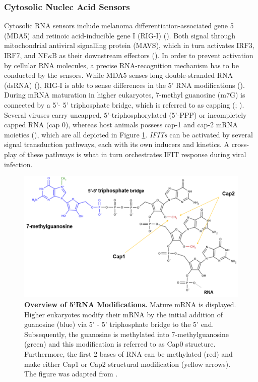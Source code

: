 \subsubsection{Cytosolic Nuclec Acid Sensors} \label{Cytosolic Nuclec Acid Sensors}
Cytosolic RNA sensors include melanoma differentiation-associated gene 5 (MDA5) and retinoic acid-inducible gene I (RIG-I) (\cite{Vladimer2014IFITs:Proteins}). Both signal through mitochondrial antiviral signalling protein (MAVS), which in turn activates IRF3, IRF7, and NF\(\kappa\)B as their downstream effectors (\cite{Ashley2019Interferon-IndependentCytomegalovirus}). In order to prevent activation by cellular RNA molecules, a precise RNA-recognition mechanism has to be conducted by the sensors. While MDA5 senses long double-stranded RNA (dsRNA) (\cite{Brisse2019ComparativeMDA5.}), RIG-I is able to sense differences in the 5’ RNA modifications (\cite{Schlee2016DiscriminatingSensing}). During mRNA maturation in higher eukaryotes, 7-methyl guanosine (m7G) is connected by a 5'- 5' triphosphate bridge, which is referred to as capping (\cite{Devarkar2016StructuralRIG-I}; \cite{Ramanathan2016MRNAApplications}). Several viruses carry uncapped, 5'-triphosphorylated (5'-PPP) or incompletely capped RNA (cap 0), whereas host animals possess cap-1 and cap-2 mRNA moieties (\cite{Choi2018ACaps}), which are all depicted in Figure \ref{fig:Overview of 5'RNA Modifications.}. \textit{IFITs} can be activated by several signal transduction pathways, each with its own inducers and kinetics. A cross-play of these pathways is what in turn orchestrates IFIT response during viral infection.

\begin{figure}
    \centering
    \includegraphics[width=0.75\linewidth]{04. Introduction//Figs/02. 5-RNA Modifications.png}
    \caption[Overview of 5'RNA Modifications.]{\textbf{Overview of 5'RNA Modifications.} Mature mRNA is displayed. Higher eukaryotes modify their mRNA by the initial addition of guanosine (blue) via 5’ - 5’ triphosphate bridge to the 5’ end. Subsequently, the guanosine is methylated into 7-methylguanosine (green) and this modification is referred to as Cap0 structure. Furthermore, the first 2 bases of RNA can be methylated (red) and make either Cap1 or Cap2 structural modification (yellow arrows). The figure was adapted from \cite{Picard-Jean2013RNAGenomes}.}
    \label{fig:Overview of 5'RNA Modifications.}
\end{figure}




